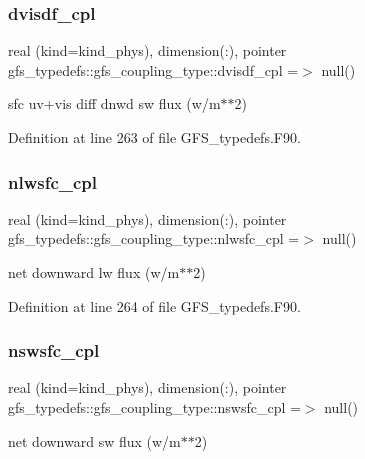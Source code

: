 \subsubsection{dvisdf\+\_\+cpl}
{\footnotesize\ttfamily real (kind=kind\+\_\+phys), dimension(\+:), pointer gfs\+\_\+typedefs\+::gfs\+\_\+coupling\+\_\+type\+::dvisdf\+\_\+cpl =$>$ null()}



sfc uv+vis diff dnwd sw flux (w/m$\ast$$\ast$2) 



Definition at line 263 of file G\+F\+S\+\_\+typedefs.\+F90.

\mbox{\label{structgfs__typedefs_1_1gfs__coupling__type_ab42140a81b7dcef20e709ebadc184915}} 
\subsubsection{nlwsfc\+\_\+cpl}
{\footnotesize\ttfamily real (kind=kind\+\_\+phys), dimension(\+:), pointer gfs\+\_\+typedefs\+::gfs\+\_\+coupling\+\_\+type\+::nlwsfc\+\_\+cpl =$>$ null()}



net downward lw flux (w/m$\ast$$\ast$2) 



Definition at line 264 of file G\+F\+S\+\_\+typedefs.\+F90.

\mbox{\label{structgfs__typedefs_1_1gfs__coupling__type_a8c40647f51478503af4ceeb17fe42c12}} 
\subsubsection{nswsfc\+\_\+cpl}
{\footnotesize\ttfamily real (kind=kind\+\_\+phys), dimension(\+:), pointer gfs\+\_\+typedefs\+::gfs\+\_\+coupling\+\_\+type\+::nswsfc\+\_\+cpl =$>$ null()}



net downward sw flux (w/m$\ast$$\ast$2) 



